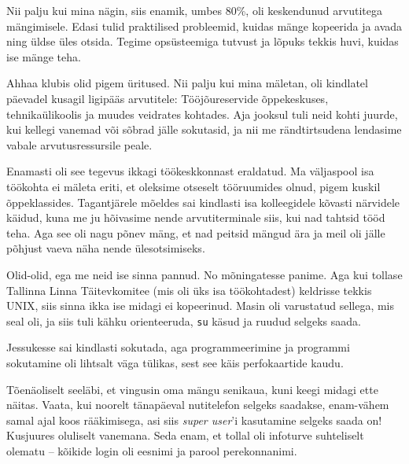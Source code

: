 Nii palju kui mina nägin, siis enamik, umbes 80\%, oli keskendunud arvutitega 
mängimisele. Edasi tulid praktilised probleemid, kuidas mänge 
kopeerida ja avada ning üldse üles otsida. Tegime 
opsüsteemiga tutvust ja lõpuks tekkis huvi, kuidas ise mänge teha.


Ahhaa klubis olid pigem üritused. Nii palju kui mina mäletan, oli 
kindlatel päevadel kusagil ligipääs arvutitele: Tööjõureservide õppekeskuses, tehnikaülikoolis ja muudes veidrates 
kohtades. Aja jooksul tuli neid kohti juurde, kui kellegi vanemad või sõbrad 
jälle sokutasid, ja nii me rändtirtsudena lendasime vabale 
arvutusressursile peale.


Enamasti oli see tegevus ikkagi töökeskkonnast eraldatud. Ma väljaspool 
isa töökohta ei mäleta eriti, et oleksime otseselt tööruumides 
olnud, pigem kuskil õppeklassides. Tagantjärele mõeldes sai kindlasti isa kolleegidele kõvasti närvidele käidud, kuna me ju hõivasime nende arvutiterminale siis, kui nad tahtsid tööd teha. Aga 
see oli nagu põnev mäng, et nad peitsid mängud ära ja meil oli 
jälle põhjust vaeva näha nende ülesotsimiseks.


Olid-olid, ega me neid ise sinna pannud. No mõningatesse panime. Aga kui 
tollase Tallinna Linna Täitevkomitee (mis oli üks isa töökohtadest) 
keldrisse tekkis UNIX, siis sinna ikka ise midagi ei kopeerinud. Masin 
oli varustatud sellega, mis seal oli, ja siis tuli kähku orienteeruda, 
\verb|su| käsud ja ruudud selgeks saada.


Jessukesse sai kindlasti sokutada, aga programmeerimine 
ja programmi sokutamine oli lihtsalt väga tülikas, sest see käis perfokaartide kaudu.


Tõenäoliselt seeläbi, et 
vingusin oma mängu senikaua, kuni keegi midagi ette näitas. Vaata, kui noorelt
tänapäeval nutitelefon selgeks saadakse, enam-vähem samal ajal koos 
rääkimisega, asi siis \emph{super user}'i kasutamine selgeks saada 
on! Kusjuures oluliselt vanemana. Seda enam, et tollal oli infoturve 
suhteliselt olematu – kõikide login oli eesnimi ja parool 
perekonnanimi.

